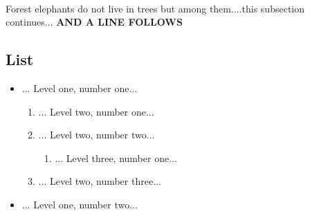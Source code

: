 \documentclass{article}
\begin{document}
\paragraph{}Forest elephants do not live in trees but among them....this subsection continues...   \textbf{AND A LINE FOLLOWS }\subsection*{List }
\begin{itemize}\item ... Level one, number one... \begin{enumerate}\item ... Level two, number one... \item ... Level two, number two... \begin{enumerate}\item ... Level three, number one... \end{enumerate}\item ... Level two, number three... \end{enumerate}\item ... Level one, number two... \end{itemize}
\end{document}
